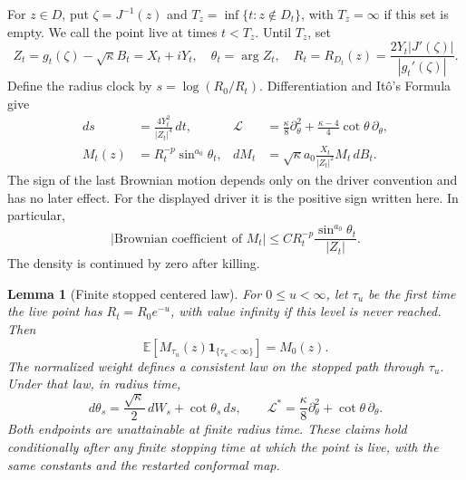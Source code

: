 \documentclass[11pt]{article}
\newtheorem{lemma}[theorem]{Lemma}
\theoremstyle{definition}
\theoremstyle{remark}
\numberwithin{equation}{section}
\begin{document}
For $z\in D$, put $\zeta=J^{-1}(z)$ and
$T_z=\inf\{t:z\notin D_t\}$, with $T_z=\infty$ if this set is empty.
We call the point live at times $t<T_z$.  Until $T_z$, set
\[
 Z_t=g_t(\zeta)-\sqrt\kappa B_t=X_t+iY_t,
 \quad\theta_t=\arg Z_t,
 \quad R_t=R_{D_t}(z)=\frac{2Y_t|J'(\zeta)|}{|g_t'(\zeta)|}.
\]
Define the radius clock by $s=\log(R_0/R_t)$.
Differentiation and It\^o's Formula give
\begin{align}
 ds&=\frac{4Y_t^2}{|Z_t|^4}\,dt,
 &\mathcal L&=\frac\kappa8\partial_\theta^2
       +\frac{\kappa-4}{4}\cot\theta\,\partial_\theta,
 \label{ll:clock}\\
 M_t(z)&=R_t^{-p}\sin^{a_0}\theta_t,
 &dM_t&=\sqrt\kappa a_0\frac{X_t}{|Z_t|^2}M_t\,dB_t.
 \label{ll:density}
\end{align}
The sign of the last Brownian motion depends only on the driver
convention and has no later effect. For the displayed driver it is
the positive sign written here.
In particular,
\begin{equation}
 |\text{Brownian coefficient of }M_t|
 \le C R_t^{-p}\frac{\sin^{a_0}\theta_t}{|Z_t|}.
 \label{ll:coefficient}
\end{equation}
The density is continued by zero after killing.

\begin{lemma}[Finite stopped centered law]\label{ll:finite-tilt}
For $0\le u<\infty$, let $\tau_u$ be the first time the live point has
$R_t=R_0e^{-u}$, with value infinity if this level is never reached.
Then
\[
 \mathbb E\left[M_{\tau_u}(z)
                   \mathbf1_{\{\tau_u<\infty\}}\right]=M_0(z).
\]
The normalized weight defines a consistent law on the stopped path
through $\tau_u$. Under that law, in radius time,
\begin{equation}
 d\theta_s=\frac{\sqrt\kappa}{2}\,dW_s
                    +\cot\theta_s\,ds,
 \qquad
 \mathcal L^*=\frac\kappa8\partial_\theta^2
                    +\cot\theta\,\partial_\theta.
 \label{ll:tilt-generator}
\end{equation}
Both endpoints are unattainable at finite radius time. These claims
hold conditionally after any finite stopping time at which the point
is live, with the same constants and the restarted conformal map.
\end{lemma}
\end{document}
